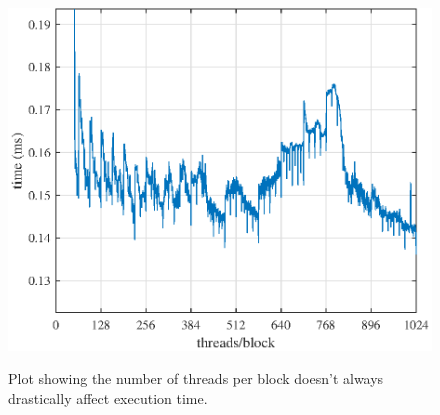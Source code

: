 \begin{figure}
	\caption{Plot showing the number of threads per block doesn't always drastically affect execution time.}
	\centering\includegraphics[width=5in]{figures/gpu_intro/ConvGPU_global_12672_186taps.eps}
	\label{fig:ConvGPU_global_12672_186taps}
\end{figure}
%

